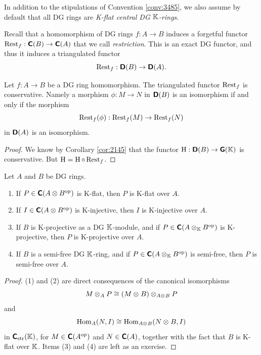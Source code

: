 \begin{conv} \label{conv:3445} 
In addition to the stipulations of Convention \ref{conv:3485}, we also 
assume by default that all DG rings are {\em K-flat central DG 
$\mathbb{K}$-rings}.
\end{conv}

Recall that a homomorphism of DG rings $f : A \to B$ induces a forgetful 
functor
$\operatorname{Rest}_f : \boldsymbol{\mathsf{C}}(B) \to \boldsymbol{\mathsf{C}}(A)$ 
that we call {\em restriction}. This is an exact DG functor, and thus 
it induces a triangulated functor  
\begin{equation} \label{eqn:3446}
\operatorname{Rest}_f : \boldsymbol{\mathsf{D}}(B) \to \boldsymbol{\mathsf{D}}(A) .
\end{equation}

\begin{prop} \label{prop:3445}
Let $f : A \to B$ be a DG ring homomorphism.
The triangulated functor $\operatorname{Rest}_f$ is conservative. Namely a morphism 
$\phi : M \to N$ in $\boldsymbol{\mathsf{D}}(B)$ is an isomorphism if and only if the morphism 
\[ \operatorname{Rest}_f(\phi) : \operatorname{Rest}_f(M) \to \operatorname{Rest}_f(N) \]
in  $\boldsymbol{\mathsf{D}}(A)$ is an isomorphism.
\end{prop}

\begin{proof}
We know by Corollary \ref{cor:2145} that the functor 
$\operatorname{H} : \boldsymbol{\mathsf{D}}(B) \to \boldsymbol{\mathsf{G}}(\mathbb{K})$
is conservative. But 
$\operatorname{H} = \operatorname{H} \circ \operatorname{Rest}_f$.
\end{proof}

\begin{lem} \label{lem:3445}
Let $A$ and $B$ be DG rings.
\begin{enumerate}
\item If $P \in \boldsymbol{\mathsf{C}}(A \otimes B^{\mathrm{op}})$ is K-flat, then $P$ is K-flat 
over 
$A$.

\item  If $I \in \boldsymbol{\mathsf{C}}(A \otimes B^{\mathrm{op}})$ is K-injective, then $I$ is 
K-injective over $A$.

\item If $B$ is K-projective as a DG $\mathbb{K}$-module, and if 
$P \in \boldsymbol{\mathsf{C}}(A \otimes_{\mathbb{K}} B^{\mathrm{op}})$ is K-projective, 
then $P$ is K-projective over $A$.

\item If $B$ is a semi-free DG $\mathbb{K}$-ring, and if 
$P \in \boldsymbol{\mathsf{C}}(A \otimes_{\mathbb{K}} B^{\mathrm{op}})$ is semi-free, 
then $P$ is semi-free over $A$.
\end{enumerate}
\end{lem}

\begin{proof}
(1) and (2) are direct consequences of the canonical isomorphisms  
\[ M \otimes_{A} P \cong (M \otimes_{} B) \otimes_{A \otimes_{} B} P \]
and
\[ \operatorname{Hom}_A(N, I) \cong  \operatorname{Hom}_{A \otimes_{} B}(N \otimes_{} B, I)  \]
in $\boldsymbol{\mathsf{C}}_{\mathrm{str}}(\mathbb{K})$, 
for $M \in \boldsymbol{\mathsf{C}}(A^{\mathrm{op}})$ and $N \in \boldsymbol{\mathsf{C}}(A)$,
together with the fact that $B$ is K-flat over $\mathbb{K}$. 
Items (3) and (4) are left as an exercise. 
\end{proof}

